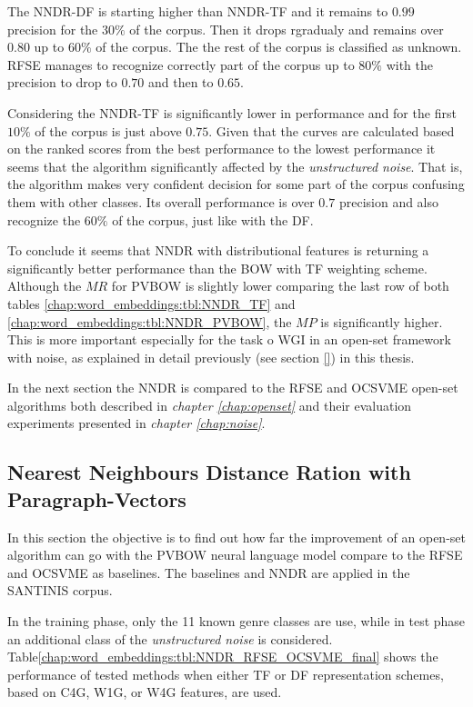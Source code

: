{\begin{figure}[H]
\end{figure}

The NNDR-DF is starting higher than NNDR-TF and it remains to $0.99$ precision for the $30\%$ of the corpus. Then it drops rgradualy and remains over $0.80$ up to $60\%$ of the corpus. The the rest of the corpus is classified as unknown. RFSE manages to recognize correctly part of the corpus up to $80\%$ with the precision to drop to $0.70$ and then to $0.65$. 

Considering the NNDR-TF is significantly lower in performance and for the first $10\%$ of the corpus is just above $0.75$. Given that the curves are calculated based on the ranked scores from the best performance to the lowest performance it seems that the algorithm significantly affected by the \textit{unstructured noise}. That is, the algorithm makes very confident decision for some part of the corpus confusing them with other classes. Its overall performance is over $0.7$ precision and also recognize the $60\%$ of the corpus, just like with the DF.

To conclude it seems that NNDR with distributional features is returning a significantly better performance than the BOW with TF weighting scheme. Although the $ΜR$ for PVBOW is slightly lower comparing the last row of both tables \ref{chap:word_embeddings:tbl:NNDR_TF} and \ref{chap:word_embeddings:tbl:NNDR_PVBOW}, the $MP$ is significantly higher. This is more important especially for the task o WGI in an open-set framework with noise, as explained in detail previously (see section \ref{}) in this thesis. 

In the next section the NNDR is compared to the RFSE and OCSVME open-set algorithms both described in \textit{chapter \ref{chap:openset}} and their evaluation experiments presented in \textit{chapter \ref{chap:noise}}.


\subsection{Nearest Neighbours Distance Ration with Paragraph-Vectors}\label{chap:word_embeddings:sec:experiments_setup}

In this section the objective is to find out  how far the improvement of an open-set algorithm can go with the PVBOW neural language model compare to the RFSE and OCSVME as baselines. The baselines and NNDR are applied in the SANTINIS corpus. 

In the training phase, only the 11 known genre classes are use, while in test phase an additional class of the \textit{unstructured noise} is considered. Table\ref{chap:word_embeddings:tbl:NNDR_RFSE_OCSVME_final} shows the performance of tested methods when either TF or DF representation schemes, based on C4G, W1G, or W4G features, are used. 

}
